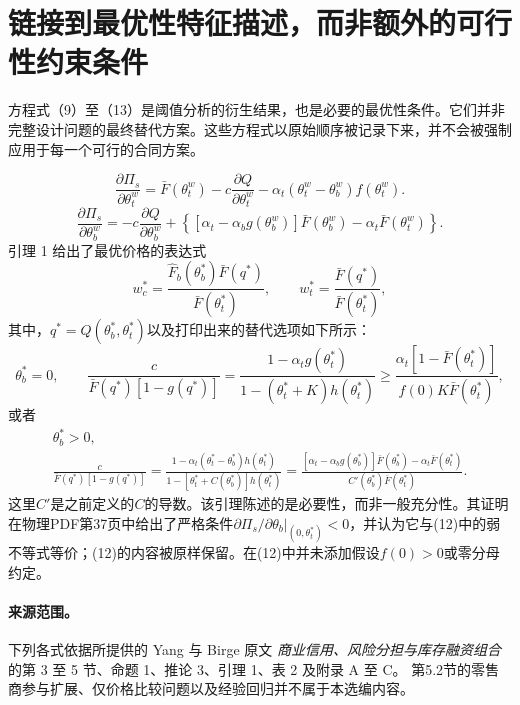 \documentclass{article}
\begin{document}
\section*{链接到最优性特征描述，而非额外的可行性约束条件}
方程式（9）至（13）是阈值分析的衍生结果，也是必要的最优性条件。它们并非完整设计问题的最终替代方案。这些方程式以原始顺序被记录下来，并不会被强制应用于每一个可行的合同方案。

\begin{equation}
\frac{\partial\Pi_s}{\partial\theta_t^w}
=\bar F(\theta_t^w)-c\frac{\partial Q}{\partial\theta_t^w}
-\alpha_t(\theta_t^w-\theta_b^w)f(\theta_t^w).\tag{9}
\end{equation}
\begin{equation}
\frac{\partial\Pi_s}{\partial\theta_b^w}
=-c\frac{\partial Q}{\partial\theta_b^w}
+\left\{[\alpha_t-\alpha_bg(\theta_b^w)]\bar F(\theta_b^w)
-\alpha_t\bar F(\theta_t^w)\right\}.\tag{10}
\end{equation}
引理 1 给出了最优价格的表达式
\begin{equation}
w_c^*=\frac{\hat F_b(\theta_b^*)\bar F(q^*)}{\bar F(\theta_t^*)},
\qquad
w_t^*=\frac{\bar F(q^*)}{\bar F(\theta_t^*)},\tag{11}
\end{equation}
其中，$q^*=Q(\theta_b^*,\theta_t^*)$以及打印出来的替代选项如下所示：
\begin{equation}
\theta_b^*=0,\qquad
\frac{c}{\bar F(q^*)[1-g(q^*)]}
=\frac{1-\alpha_tg(\theta_t^*)}{1-(\theta_t^*+K)h(\theta_t^*)}
\geq\frac{\alpha_t[1-\bar F(\theta_t^*)]}{f(0)K\bar F(\theta_t^*)},\tag{12}
\end{equation}
或者
\begin{equation}
\begin{gathered}
\theta_b^*>0,\\
\frac{c}{\bar F(q^*)[1-g(q^*)]}
=\frac{1-\alpha_t(\theta_t^*-\theta_b^*)h(\theta_t^*)}
{1-[\theta_t^*+C(\theta_b^*)]h(\theta_t^*)}
=\frac{[\alpha_t-\alpha_bg(\theta_b^*)]\bar F(\theta_b^*)
-\alpha_t\bar F(\theta_t^*)}{C'(\theta_b^*)\bar F(\theta_t^*)}.
\end{gathered}\tag{13}
\end{equation}
这里$C'$是之前定义的$C$的导数。该引理陈述的是必要性，而非一般充分性。其证明在物理PDF第37页中给出了严格条件$\partial\Pi_s/\partial\theta_b\vert_{(0,\theta_t^*)}<0$，并认为它与(12)中的弱不等式等价；(12)的内容被原样保留。在(12)中并未添加假设$f(0)>0$或零分母约定。

\paragraph{来源范围。}
下列各式依据所提供的 Yang 与 Birge 原文 \emph{商业信用、风险分担与库存融资组合} 的第 3 至 5 节、命题 1、推论 3、引理 1、表 2 及附录 A 至 C。 第5.2节的零售商参与扩展、仅价格比较问题以及经验回归并不属于本选编内容。
\end{document}

